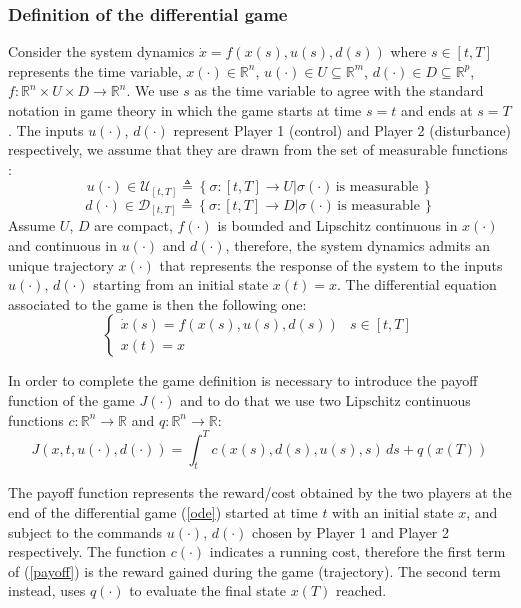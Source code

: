 \subsubsection{Definition of the differential game}
Consider the system dynamics $\dot{x}=f(x(s), u(s), d(s))$ where $s \in [t, T]$ represents the time variable, $x(\cdot)\in\mathbb{R}^n$, $u(\cdot)\in U\subseteq \mathbb{R}^m$, $d(\cdot)\in D\subseteq \mathbb{R}^p$, $f:\mathbb{R}^n \times U \times D \rightarrow \mathbb{R}^n$. We use $s$ as the time variable to agree with the standard notation in game theory in which the game starts at time $s=t$ and ends at $s=T$ \cite{evans}.
The inputs $u(\cdot)$, $d(\cdot)$ represent Player 1 (control) and Player 2 (disturbance) respectively, we assume that they are drawn from the set of measurable functions \cite{evans}\cite{brief_intro}:
\[ 
    u(\cdot) \in \mathcal{U}_{[t, T]}  \triangleq 
    \left\{
        \sigma: [t, T] \rightarrow U| \sigma(\cdot) \, \textrm{is measurable} \, 
    \right\} 
\]
\[ 
    d(\cdot) \in \mathcal{D}_{[t, T]}  \triangleq 
    \left\{
        \sigma: [t, T] \rightarrow D| \sigma(\cdot) \, \textrm{is measurable} \, 
    \right\} 
\]
Assume $U$, $D$ are compact, $f(\cdot)$ is bounded and Lipschitz continuous in $x(\cdot)$ and continuous in $u(\cdot)$ and $d(\cdot)$, therefore, the system dynamics admits an unique trajectory $x(\cdot)$ that represents the response of the system to the inputs $u(\cdot)$, $d(\cdot)$ starting from an initial state $x(t)=x$.
The differential equation associated to the game is then the following one:
\begin{equation}
	\label{ode}
	\left\{
		\begin{array}{ll}
			\dot{x}(s)=f(x(s), u(s), d(s))  & s \in [t, T] \\
			x(t) = x
		\end{array}
	\right.
\end{equation}

In order to complete the game definition is necessary to introduce the payoff function of the game $J(\cdot)$ and to do that we use two Lipschitz continuous functions $c:\mathbb{R}^n \rightarrow \mathbb{R}$ and $q:\mathbb{R}^n \rightarrow \mathbb{R}$:
\begin{equation}
	\label{payoff}
	J(x, t, u(\cdot), d(\cdot)) = \int_{t}^{T} c(x(s),d(s),u(s),s)  \,ds + q(x(T)) 
\end{equation}

The payoff function represents the reward/cost obtained by the two players at the end of the differential game (\ref{ode}) started at time $t$ with an initial state $x$, and subject to the commands  $u(\cdot)$, $d(\cdot)$ chosen by Player 1 and Player 2 respectively. The function $c(\cdot)$ indicates a running cost, therefore the first term of (\ref{payoff}) is the reward gained during the game (trajectory). The second term instead, uses $q(\cdot)$ to evaluate the final state $x(T)$ reached.
\newline

